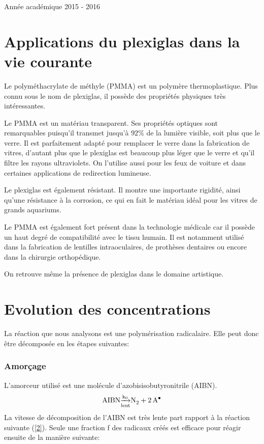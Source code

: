 \documentclass[a4paper,oneside,12pt]{article}
\begin{document}
\begin{titlepage}
	\vspace{0.4cm}
	
	{\normalsize Année académique 2015 - 2016}\\
	
\end{titlepage}

\part{Applications du plexiglas dans la vie courante}

Le polyméthacrylate de méthyle (PMMA) est un polymère thermoplastique. Plus connu sous le nom de plexiglas, il possède des propriétés physiques très intéressantes.

Le PMMA est un matériau transparent. Ses propriétés optiques sont remarquables puisqu'il transmet jusqu'à $92\%$ de la lumière visible, soit plus que le verre. Il est parfaitement adapté pour remplacer le verre dans la fabrication de vitres, d'autant plus que le plexiglas est beaucoup plus léger que le verre et qu'il filtre les rayons ultraviolets. On l'utilise aussi pour les feux de voiture et dans certaines applications de redirection lumineuse.

Le plexiglas est également résistant. Il montre une importante rigidité, ainsi qu'une résistance à la corrosion, ce qui en fait le matériau idéal pour les vitres de grands aquariums.

Le PMMA est également fort présent dans la technologie médicale car il possède un haut degré de compatibilité avec le tissu humain.
Il est notamment utilisé dans la fabrication de lentilles intraoculaires, de prothèses dentaires ou encore dans la chirurgie orthopédique. 

On retrouve même la présence de plexiglas dans le domaine artistique.

\part{Evolution des concentrations}
La réaction que nous analysons est une polymérisation radicalaire. Elle peut donc être décomposée en les étapes suivantes:
\section{Amorçage}
L'amorceur utilisé est une molécule d'azobisisobutyronitrile (AIBN). 
\begin{equation}
	\ce{AIBN \underset{lent}{\xrightarrow{k_0}} N2 + 2A^{\bullet}}
\end{equation}	
La vitesse de décomposition de l'AIBN est très lente part rapport à la réaction suivante (\ref{2}). Seule une fraction f des radicaux créés est efficace pour réagir ensuite de la manière suivante:
\end{document}

